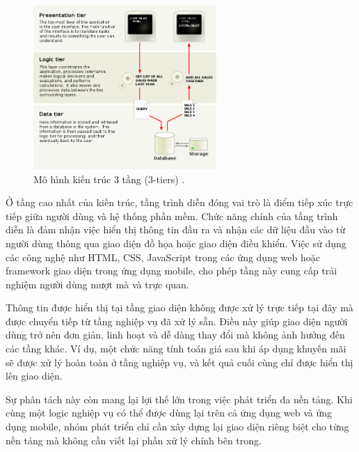 \begin{figure}[H]
  \centering
  \includegraphics[width=0.62\textwidth]{images/layer.png}
  \caption{Mô hình kiến trúc 3 tầng (3-tiers) \cite{vneconomyNokia}.}
  \label{fig:15}
\end{figure}
  
  
  \hspace*{0.8cm}Ở tầng cao nhất của kiến trúc, tầng trình diễn đóng vai trò là điểm tiếp xúc trực tiếp giữa người dùng và hệ thống phần mềm. Chức năng chính của tầng trình diễn là đảm nhận việc hiển thị thông tin đầu ra và nhận các dữ liệu đầu vào từ người dùng thông qua giao diện đồ họa hoặc giao diện điều khiển. Việc sử dụng các công nghệ như HTML, CSS, JavaScript trong các ứng dụng web hoặc framework giao diện trong ứng dụng mobile, cho phép tầng này cung cấp trải nghiệm người dùng mượt mà và trực quan.
  \vspace{0.5em}
  
  
  \hspace*{0.8cm}Thông tin được hiển thị tại tầng giao diện không được xử lý trực tiếp tại đây mà được chuyển tiếp từ tầng nghiệp vụ đã xử lý sẵn. Điều này giúp giao diện người dùng trở nên đơn giản, linh hoạt và dễ dàng thay đổi mà không ảnh hưởng đến các tầng khác. Ví dụ, một chức năng tính toán giá sau khi áp dụng khuyến mãi sẽ được xử lý hoàn toàn ở tầng nghiệp vụ, và kết quả cuối cùng chỉ được hiển thị lên giao diện.
  \vspace{0.5em}
  
  
  \hspace*{0.8cm}Sự phân tách này còn mang lại lợi thế lớn trong việc phát triển đa nền tảng. Khi cùng một logic nghiệp vụ có thể được dùng lại trên cả ứng dụng web và ứng dụng mobile, nhóm phát triển chỉ cần xây dựng lại giao diện riêng biệt cho từng nền tảng mà không cần viết lại phần xử lý chính bên trong.
  \vspace{0.5em}
  
